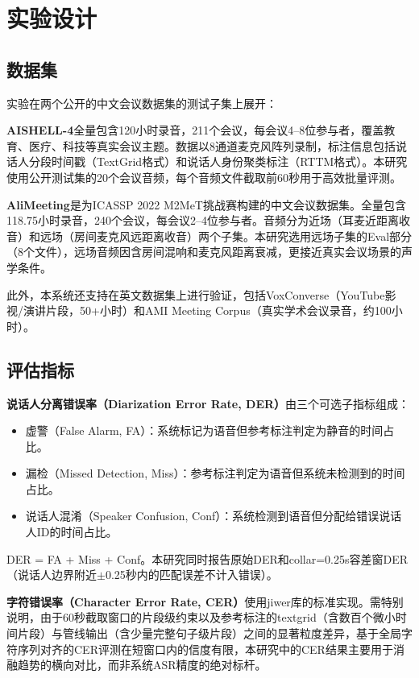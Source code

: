 \documentclass[12pt, a4paper]{article}
\begin{document}
\section{实验设计}

\subsection{数据集}

实验在两个公开的中文会议数据集的测试子集上展开：

\textbf{AISHELL-4}\cite{fu2021aishell4}全量包含120小时录音，211个会议，每会议4--8位参与者，覆盖教育、医疗、科技等真实会议主题。数据以8通道麦克风阵列录制，标注信息包括说话人分段时间戳（TextGrid格式）和说话人身份聚类标注（RTTM格式）。本研究使用公开测试集的20个会议音频，每个音频文件截取前60秒用于高效批量评测。

\textbf{AliMeeting}\cite{yu2022m2met}是为ICASSP 2022 M2MeT挑战赛构建的中文会议数据集。全量包含118.75小时录音，240个会议，每会议2--4位参与者。音频分为近场（耳麦近距离收音）和远场（房间麦克风远距离收音）两个子集。本研究选用远场子集的Eval部分（8个文件），远场音频因含房间混响和麦克风距离衰减，更接近真实会议场景的声学条件。

此外，本系统还支持在英文数据集上进行验证，包括VoxConverse（YouTube影视/演讲片段，50+小时）和AMI Meeting Corpus\cite{carletta2005ami}（真实学术会议录音，约100小时）。

\subsection{评估指标}

\textbf{说话人分离错误率（Diarization Error Rate, DER）}由三个可选子指标组成：
\begin{itemize}
    \item 虚警（False Alarm, FA）：系统标记为语音但参考标注判定为静音的时间占比。
    \item 漏检（Missed Detection, Miss）：参考标注判定为语音但系统未检测到的时间占比。
    \item 说话人混淆（Speaker Confusion, Conf）：系统检测到语音但分配给错误说话人ID的时间占比。
\end{itemize}
DER = FA + Miss + Conf。本研究同时报告原始DER和collar=0.25s容差窗DER（说话人边界附近$\pm$0.25秒内的匹配误差不计入错误）。

\textbf{字符错误率（Character Error Rate, CER）}使用jiwer库的标准实现。需特别说明，由于60秒截取窗口的片段级约束以及参考标注的textgrid（含数百个微小时间片段）与管线输出（含少量完整句子级片段）之间的显著粒度差异，基于全局字符序列对齐的CER评测在短窗口内的信度有限，本研究中的CER结果主要用于消融趋势的横向对比，而非系统ASR精度的绝对标杆。
\end{document}
